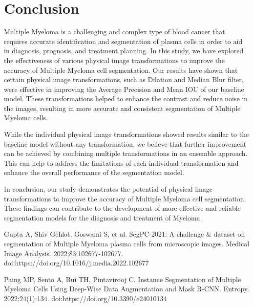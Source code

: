 \documentclass{article}
\begin{document}
\section{Conclusion}

Multiple Myeloma is a challenging and complex type of blood cancer that requires accurate identification and segmentation of plasma cells in order to aid in diagnosis, prognosis, and treatment planning. In this study, we have explored the effectiveness of various physical image transformations to improve the accuracy of Multiple Myeloma cell segmentation. Our results have shown that certain physical image transformations, such as Dilation and Median Blur filter, were effective in improving the Average Precision and Mean IOU of our baseline model. These transformations helped to enhance the contrast and reduce noise in the images, resulting in more accurate and consistent segmentation of Multiple Myeloma cells.

While the individual physical image transformations showed results similar to the baseline model without any transformation, we believe that further improvement can be achieved by combining multiple transformations in an ensemble approach. This can help to address the limitations of each individual transformation and enhance the overall performance of the segmentation model.

In conclusion, our study demonstrates the potential of physical image transformations to improve the accuracy of Multiple Myeloma cell segmentation. These findings can contribute to the development of more effective and reliable segmentation models for the diagnosis and treatment of Myeloma.

\begin{thebibliography}{99}

\bibitem{} Gupta A, Shiv Gehlot, Goswami S, et al. SegPC-2021: A challenge \& dataset on segmentation of Multiple Myeloma plasma cells from microscopic images. Medical Image Analysis. 2022;83:102677-102677. doi:https://doi.org/10.1016/j.media.2022.102677

\bibitem{} Paing MP, Sento A, Bui TH, Pintavirooj C. Instance Segmentation of Multiple Myeloma Cells Using Deep-Wise Data Augmentation and Mask R-CNN. Entropy. 2022;24(1):134. doi:https://doi.org/10.3390/e24010134
  
\end{thebibliography}
\end{document}

